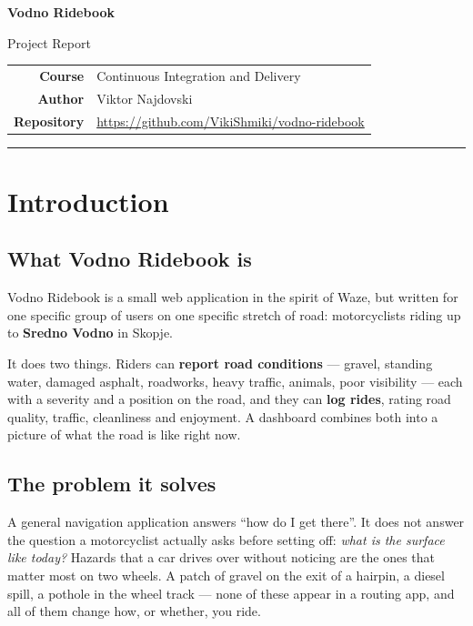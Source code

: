 \documentclass[10pt,a4paper]{article}
\begin{document}
\begin{center}
  {\LARGE\bfseries Vodno Ridebook\par}
  \vspace{0.35em}
  {\large Project Report\par}
  \vspace{0.9em}
  \begin{tabular}{@{}rl@{}}
    \textbf{Course} & Continuous Integration and Delivery \\
    \textbf{Author} & Viktor Najdovski \\
    \textbf{Repository} & \url{https://github.com/VikiShmiki/vodno-ridebook} \\
  \end{tabular}
\end{center}
\vspace{0.6em}
\textcolor{rulegrey}{\rule{\linewidth}{0.8pt}}

\section{Introduction}

\subsection{What Vodno Ridebook is}

Vodno Ridebook is a small web application in the spirit of Waze, but written
for one specific group of users on one specific stretch of road:
motorcyclists riding up to \textbf{Sredno Vodno} in Skopje.

It does two things. Riders can \textbf{report road conditions} --- gravel,
standing water, damaged asphalt, roadworks, heavy traffic, animals, poor
visibility --- each with a severity and a position on the road, and they can
\textbf{log rides}, rating road quality, traffic, cleanliness and enjoyment.
A dashboard combines both into a picture of what the road is like right now.

\subsection{The problem it solves}

A general navigation application answers ``how do I get there''. It does not
answer the question a motorcyclist actually asks before setting off:
\emph{what is the surface like today?} Hazards that a car drives over without
noticing are the ones that matter most on two wheels. A patch of gravel on the
exit of a hairpin, a diesel spill, a pothole in the wheel track --- none of
these appear in a routing app, and all of them change how, or whether, you
ride.
\end{document}
